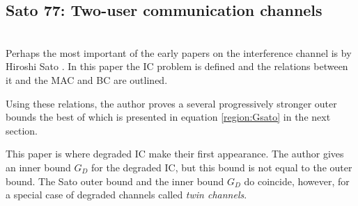 \documentclass[aps,11pt,twoside,letterpaper]{article}
\begin{document}


            




        \subsection{Sato 77: Two-user communication channels} \ \\

            Perhaps the most important of the early papers on the interference channel is 
            by Hiroshi Sato \cite{Sato77}.
            In this paper the IC problem is defined and the relations between it and the
            MAC and BC are outlined.
            
            Using these relations, the author proves a several progressively stronger 
            outer bounds the best of which is presented in equation \eqref{region:Gsato} in
            the next section.
            
            
            This paper is where degraded IC make their first appearance.
            The author gives an inner bound $G_D$ for the degraded IC,
            but this bound is not equal to the outer bound.
            The Sato outer bound and the inner bound $G_D$ do coincide,
            however, for a special case of degraded channels called \emph{twin channels}.
            
\end{document}

